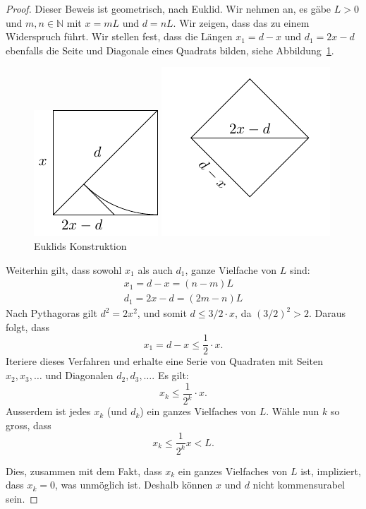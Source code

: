 \documentclass[../main.tex]{subfiles}
\begin{document}
\begin{proof}
  Dieser Beweis ist geometrisch, nach Euklid. Wir nehmen an, es gäbe $L > 0$ und
  $m,n \in \mathbb N$ mit $x = mL$ und $d = nL$. Wir zeigen, dass das zu einem Widerspruch
  führt.
  Wir stellen fest, dass die Längen $x_{1} = d-x$ und $d_{1} = 2x - d$
  ebenfalls die Seite und Diagonale eines Quadrats bilden, siehe
  Abbildung~\ref{fig:euklid}.

  \begin{figure}[htb]
    \centering
    \begin{minipage}{0.4\linewidth}
      \centering
      \includegraphics{images/euklid-quadrat}
    \end{minipage}%
    \begin{minipage}{0.4\linewidth}
      \centering
      \includegraphics{images/euklid-quadrat2}
    \end{minipage}
    \caption{Euklids Konstruktion}%
    \label{fig:euklid}
  \end{figure}

  Weiterhin gilt, dass sowohl $x_{1}$ als auch $d_{1}$, ganze Vielfache von $L$ sind:
  \begin{align*}
    x_{1} = d-x = (n-m)L \\
    d_{1} = 2x-d = (2m -n)L
  \end{align*}
  Nach Pythagoras gilt $d^{2} = 2x^{2}$, und somit $d \leq 3/2\cdot x$, da ${(3/2)}^{2} > 2$.
  Daraus folgt, dass
  \[x_{1} = d - x \leq \frac{1}{2} \cdot x.\]
  Iteriere dieses Verfahren und erhalte eine Serie von Quadraten mit Seiten
  $x_{2}, x_{3}, \dots$ und Diagonalen $d_{2}, d_{3}, \dots$. Es gilt:
  \[x_{k} \leq \frac{1}{2^{k}} \cdot x.\]
  Ausserdem ist jedes $x_{k}$ (und $d_{k}$) ein ganzes Vielfaches von $L$.
  Wähle nun $k$ so gross, dass
   \[x_{k} \leq \frac{1}{2^{k}} x < L.\]

   Dies, zusammen mit dem Fakt, dass
   $x_{k}$ ein ganzes Vielfaches von $L$ ist,
   impliziert, dass $x_{k} = 0$, was unmöglich ist. Deshalb können $x$ und $d$
   nicht kommensurabel sein.
\end{proof}
\end{document}
